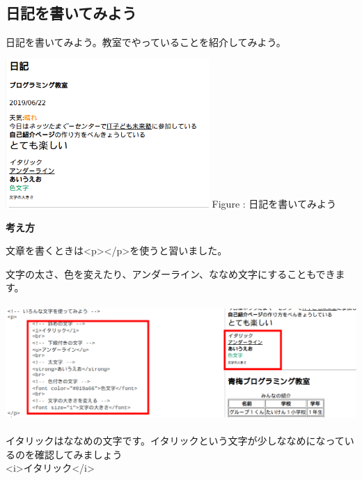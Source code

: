\documentclass[a4paper,12pt]{jarticle}
\begin{document}
\bigskip

\clearpage
{}
\subsection{\theExercise 日記を書いてみよう}
日記を書いてみよう。教室でやっていることを紹介してみよう。

\centering
\begin{minipage}{6.32cm}
  {\upshape
    \includegraphics[width=7.724cm,height=5.643cm]{textbook-img185.png}
    \newline
    Figure : 日記を書いてみよう}
\end{minipage}

\bigskip

\flushleft
\textbf{考え方}



文章を書くときは{\textless}p{\textgreater}{\textless}/p{\textgreater}を使うと習いました。

文字の太さ、色を変えたり、アンダーライン、ななめ文字にすることもできます。

\centering
\includegraphics[width=14.284cm,height=4.427cm]{textbook-img186.png}

\bigskip

\flushleft

イタリックはななめの文字です。イタリックという文字が少しななめになっているのを確認してみましょう\\
{\textless}i{\textgreater}イタリック{\textless}/i{\textgreater}\\
\end{document}
